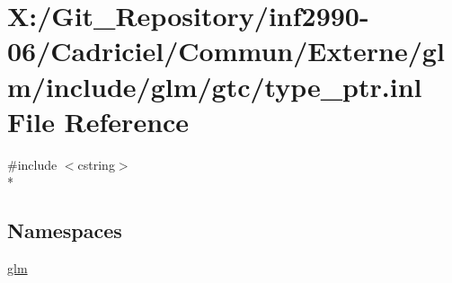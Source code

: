 \hypertarget{type__ptr_8inl}{\section{X\-:/\-Git\-\_\-\-Repository/inf2990-\/06/\-Cadriciel/\-Commun/\-Externe/glm/include/glm/gtc/type\-\_\-ptr.inl File Reference}
\label{type__ptr_8inl}
}
{\ttfamily \#include $<$cstring$>$}\\*
\subsection*{Namespaces}
\begin{DoxyCompactItemize}
\item 
\hyperlink{namespaceglm}{glm}
\end{DoxyCompactItemize}
